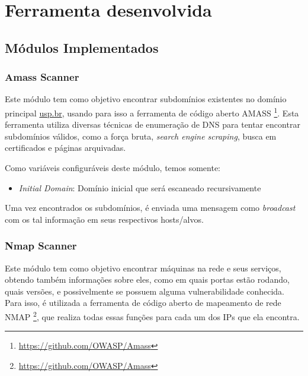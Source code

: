 
\chapter{Ferramenta desenvolvida}
\label{cap:metodologia}


\section{Módulos Implementados}

    \subsection{Amass Scanner}
    
    Este módulo tem como objetivo encontrar subdomínios existentes no domínio principal \url{usp.br}, usando para isso a ferramenta de código aberto AMASS \footnote{\url{https://github.com/OWASP/Amass}}. Esta ferramenta utiliza diversas técnicas de enumeração de DNS para tentar encontrar subdomínios válidos, como a força bruta, \textit{search engine scraping}, busca em certificados e páginas arquivadas.
    
    Como variáveis configuráveis deste módulo, temos somente:
    \begin{itemize}
    \item \emph{Initial Domain}: Domínio inicial que será escaneado recursivamente
    \end{itemize}
    
    Uma vez encontrados os subdomínios, é enviada uma mensagem como \textit{broadcast} com os tal informação em seus respectivos hosts/alvos.
    \subsection{Nmap Scanner}
    Este módulo tem como objetivo encontrar máquinas na rede e seus serviços, obtendo também informações sobre eles, como em quais portas estão rodando, quais versões, e possivelmente se possuem alguma vulnerabilidade conhecida. Para isso, é utilizada a ferramenta de código aberto de mapeamento de rede NMAP \footnote{\url{https://github.com/OWASP/Amass}}, que realiza todas essas funções para cada um dos IPs que ela encontra.
    
